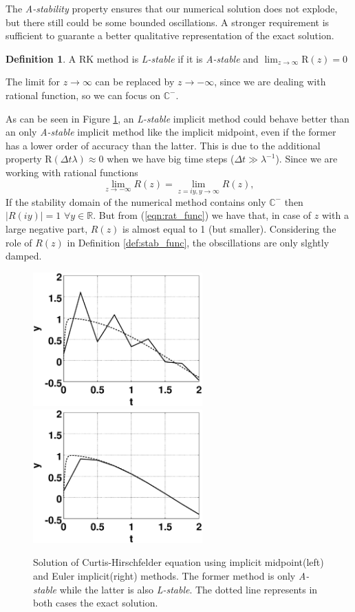 \documentclass[a4paper,11pt ]{report}
\theoremstyle{definition}
\newtheorem{definition}{Definition}
\begin{document}
The \textit{A-stability} property ensures that our numerical solution does not explode, but there still could be some bounded oscillations. A stronger requirement is sufficient to guarante a better qualitative representation of the exact solution.
\theoremstyle{definition}
\begin{definition}{}
A RK method is \textit{L-stable} if it is \textit{A-stable} and $\lim_{z\to\infty}\text{R}(z)=0$
\end{definition}{}
The limit for $z\to\infty$ can be replaced by $z\to-\infty$, since we are dealing with rational function, so we can focus on $\mathbb{C}^-$. 

As can be seen in Figure \ref{fig:A_stability}, an \textit{L-stable} implicit method could behave better than an only \textit{A-stable} implicit method like the implicit midpoint, even if the former has a lower order of accuracy than the latter. This is due to the additional property $\text{R}(\Delta t \lambda)\approx 0$ when we have big time steps ($\Delta t \gg \lambda^{-1}$).
Since we are working with rational functions
\begin{equation}
\lim_{z\to -\infty}R(z)=\lim_{z=iy,y\to\infty}R(z),
\label{eqn:rat_func}
\end{equation}
If the stability domain of the numerical method contains only $\mathbb{C}^-$ then $\vert R(iy)\vert =1$ $\forall y\in\mathbb{R}$. But from (\ref{eqn:rat_func}) we have that, in case of $z$ with a large negative part, $R(z)$ is almost equal to 1 (but smaller). Considering the role of $R(z)$ in Definition \ref{def:stab_func}, the obscillations are only slghtly damped.
\begin{figure}
\includegraphics[width=6.5cm]{img/imp_mid.eps}
\includegraphics[width=6.5cm]{img/eul_imp.eps}
\caption{Solution of Curtis-Hirschfelder equation using implicit midpoint(left) and Euler implicit(right) methods. The former method is only \textit{A-stable} while the latter is also \textit{L-stable}. The dotted line represents in both cases the exact solution.}\label{fig:A_stability}
\end{figure}
\end{document}
